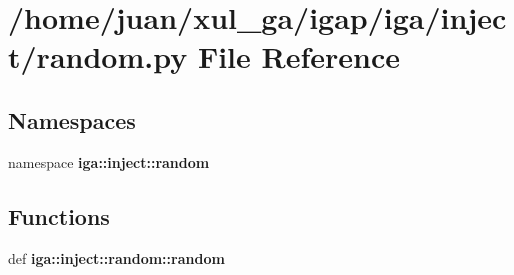 \section{/home/juan/xul\_\-ga/igap/iga/inject/random.py File Reference}
\label{inject_2random_8py}
\subsection*{Namespaces}
\begin{CompactItemize}
\item 
namespace {\bf iga::inject::random}
\end{CompactItemize}
\subsection*{Functions}
\begin{CompactItemize}
\item 
def {\bf iga::inject::random::random}
\end{CompactItemize}
